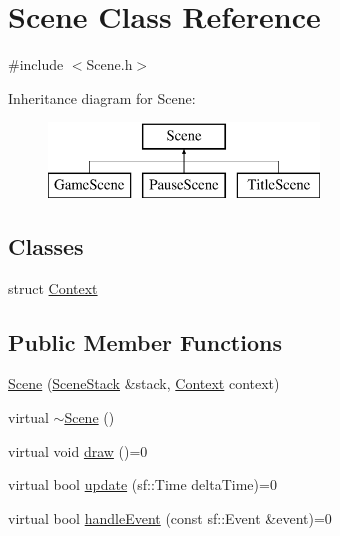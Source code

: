 \hypertarget{class_scene}{}\section{Scene Class Reference}
\label{class_scene}


{\ttfamily \#include $<$Scene.\+h$>$}

Inheritance diagram for Scene\+:\begin{figure}[H]
\begin{center}
\leavevmode
\includegraphics[height=2.000000cm]{class_scene}
\end{center}
\end{figure}
\subsection*{Classes}
\begin{DoxyCompactItemize}
\item 
struct \hyperlink{struct_scene_1_1_context}{Context}
\end{DoxyCompactItemize}
\subsection*{Public Member Functions}
\begin{DoxyCompactItemize}
\item 
\hyperlink{class_scene_a9834819a1140a2c066024927e6dc9692}{Scene} (\hyperlink{class_scene_stack}{Scene\+Stack} \&stack, \hyperlink{struct_scene_1_1_context}{Context} context)
\item 
virtual \hyperlink{class_scene_a3b8cec2e32546713915f8c6303c951f1}{$\sim$\+Scene} ()
\item 
virtual void \hyperlink{class_scene_a789c16961aa1e316b2a4a05b95187546}{draw} ()=0
\item 
virtual bool \hyperlink{class_scene_a72683c984a1da2ce4f757705e93730f2}{update} (sf\+::\+Time delta\+Time)=0
\item 
virtual bool \hyperlink{class_scene_af25e4d2c998aca4e95899fb67488e815}{handle\+Event} (const sf\+::\+Event \&event)=0
\end{DoxyCompactItemize}
